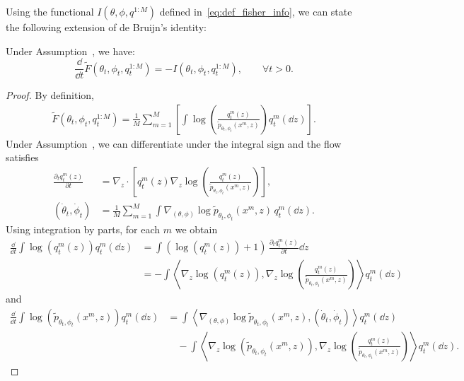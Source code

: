 Using the functional $I(\theta, \phi, q^{1:M})$ defined in~\eqref{eq:def_fisher_info}, we can state the following extension of de Bruijn's identity:
\begin{proposition}\label{prop:de_bruijin}
    Under Assumption~, we have:
    \begin{equation}\label{eq:de_bruijin}
        \frac{\dd}{\dd t} \tilde{F}(\theta_t, \phi_t, q_t^{1:M}) = -I(\theta_t, \phi_t, q_t^{1:M}), \qquad \forall t>0.
    \end{equation}
\end{proposition}
\begin{proof}
    By definition,
    \begin{align*}
        \tilde{F}(\theta_t,\phi_t,q_t^{1:M})
        = \frac{1}{M}\sum_{m=1}^M \left[
            \int \log\left(\frac{q_t^m(z)}{\tilde{p}_{\theta_t,\phi_t}(x^m,z)}\right) q_t^m(\dd z)
        \right].
    \end{align*}
    Under Assumption~, we can differentiate under the integral sign and the flow satisfies
    \begin{align*}
        \frac{\partial_t q_t^m(z)}{\partial t} &= \nabla_z \cdot \left[
            q_t^m(z)\nabla_z \log \left(\frac{q_t^m(z)}{\tilde{p}_{\theta_t,\phi_t}(x^m,z)}\right)
        \right], \\
        (\dot{\theta}_t,\dot{\phi}_t) &= \frac{1}{M}\sum_{m=1}^M \int \nabla_{(\theta,\phi)} \log \tilde{p}_{\theta_t,\phi_t}(x^m,z)\, q_t^m(\dd z).
    \end{align*}
    Using integration by parts, for each $m$ we obtain
    \begin{align*}
        \frac{\dd}{\dd t} \int \log(q_t^m(z)) q_t^m(\dd z)
        &= \int (\log(q_t^m(z))+1)\, \frac{\partial_t q_t^m(z)}{\partial t}\dd z \\
        &= - \int \left\langle \nabla_z \log(q_t^m(z)), \nabla_z \log \left(\frac{q_t^m(z)}{\tilde{p}_{\theta_t,\phi_t}(x^m,z)}\right) \right\rangle q_t^m(\dd z)
    \end{align*}
    and
    \begin{align*}
        \frac{\dd}{\dd t} \int \log(\tilde{p}_{\theta_t,\phi_t}(x^m,z)) q_t^m(\dd z)
        &= \int \left\langle \nabla_{(\theta,\phi)} \log \tilde{p}_{\theta_t,\phi_t}(x^m,z), (\dot{\theta}_t,\dot{\phi}_t) \right\rangle q_t^m(\dd z) \\
        &\quad - \int \left\langle \nabla_z \log(\tilde{p}_{\theta_t,\phi_t}(x^m,z)), \nabla_z \log \left(\frac{q_t^m(z)}{\tilde{p}_{\theta_t,\phi_t}(x^m,z)}\right) \right\rangle q_t^m(\dd z).

\end{align*}
\end{proof}
